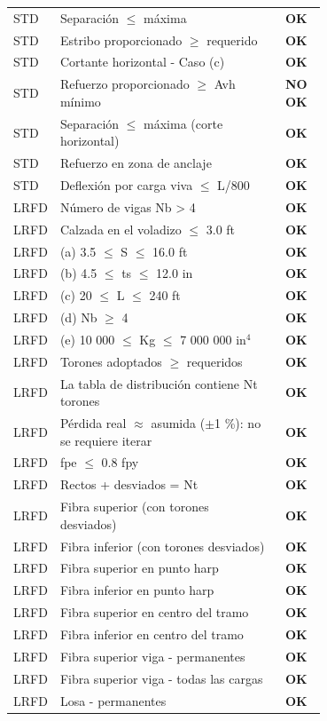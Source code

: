 \documentclass[10pt,a4paper]{article}
\newcommand{\ok}[1]{\textcolor{verde}{\textbf{#1}}}
\newcommand{\nook}[1]{\textcolor{rojo}{\textbf{#1}}}
\begin{document}
\begin{longtable}{@{}l p{0.7\linewidth} c@{}}
STD & Separación $\le$ máxima & \ok{OK} \\
STD & Estribo proporcionado $\ge$ requerido & \ok{OK} \\
STD & Cortante horizontal - Caso (c) & \ok{OK} \\
STD & Refuerzo proporcionado $\ge$ Avh mínimo & \nook{NO OK} \\
STD & Separación $\le$ máxima (corte horizontal) & \ok{OK} \\
STD & Refuerzo en zona de anclaje & \ok{OK} \\
STD & Deflexión por carga viva $\le$ L/800 & \ok{OK} \\
LRFD & Número de vigas Nb > 4 & \ok{OK} \\
LRFD & Calzada en el voladizo $\le$ 3.0 ft & \ok{OK} \\
LRFD & (a) 3.5 $\le$ S $\le$ 16.0 ft & \ok{OK} \\
LRFD & (b) 4.5 $\le$ ts $\le$ 12.0 in & \ok{OK} \\
LRFD & (c) 20 $\le$ L $\le$ 240 ft & \ok{OK} \\
LRFD & (d) Nb $\ge$ 4 & \ok{OK} \\
LRFD & (e) 10 000 $\le$ Kg $\le$ 7 000 000 in$^{4}$ & \ok{OK} \\
LRFD & Torones adoptados $\ge$ requeridos & \ok{OK} \\
LRFD & La tabla de distribución contiene Nt torones & \ok{OK} \\
LRFD & Pérdida real $\approx$ asumida ($\pm$1 \%): no se requiere iterar & \ok{OK} \\
LRFD & fpe $\le$ 0.8 fpy & \ok{OK} \\
LRFD & Rectos + desviados = Nt & \ok{OK} \\
LRFD & Fibra superior (con torones desviados) & \ok{OK} \\
LRFD & Fibra inferior (con torones desviados) & \ok{OK} \\
LRFD & Fibra superior en punto harp & \ok{OK} \\
LRFD & Fibra inferior en punto harp & \ok{OK} \\
LRFD & Fibra superior en centro del tramo & \ok{OK} \\
LRFD & Fibra inferior en centro del tramo & \ok{OK} \\
LRFD & Fibra superior viga - permanentes & \ok{OK} \\
LRFD & Fibra superior viga - todas las cargas & \ok{OK} \\
LRFD & Losa - permanentes & \ok{OK} \\

\end{longtable}
\end{document}
